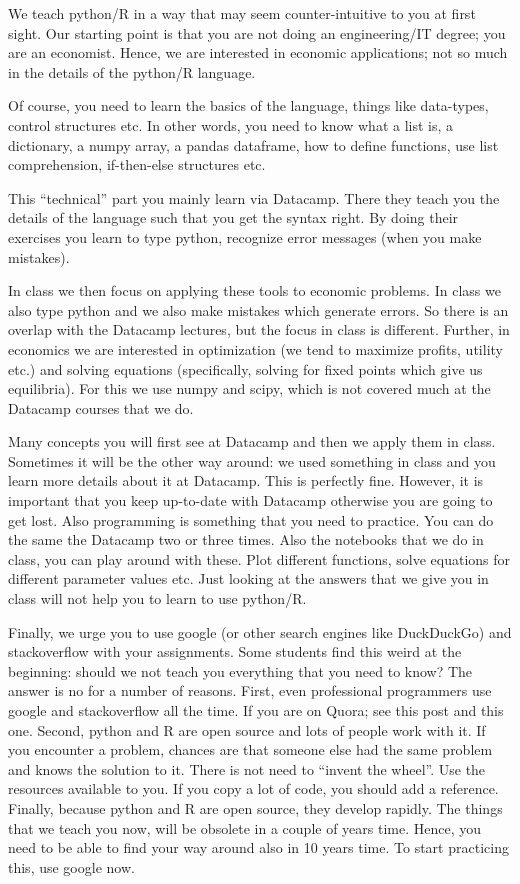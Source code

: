 \documentclass[]{book}
\begin{document}
We teach python/R in a way that may seem counter-intuitive to you at first sight. Our starting point is that you are not doing an engineering/IT degree; you are an economist. Hence, we are interested in economic applications; not so much in the details of the python/R language.

Of course, you need to learn the basics of the language, things like data-types, control structures etc. In other words, you need to know what a list is, a dictionary, a numpy array, a pandas dataframe, how to define functions, use list comprehension, if-then-else structures etc.

This ``technical'' part you mainly learn via Datacamp. There they teach you the details of the language such that you get the syntax right. By doing their exercises you learn to type python, recognize error messages (when you make mistakes).

In class we then focus on applying these tools to economic problems. In class we also type python and we also make mistakes which generate errors. So there is an overlap with the Datacamp lectures, but the focus in class is different. Further, in economics we are interested in optimization (we tend to maximize profits, utility etc.) and solving equations (specifically, solving for fixed points which give us equilibria). For this we use numpy and scipy, which is not covered much at the Datacamp courses that we do.

Many concepts you will first see at Datacamp and then we apply them in class. Sometimes it will be the other way around: we used something in class and you learn more details about it at Datacamp. This is perfectly fine. However, it is important that you keep up-to-date with Datacamp otherwise you are going to get lost. Also programming is something that you need to practice. You can do the same the Datacamp two or three times. Also the notebooks that we do in class, you can play around with these. Plot different functions, solve equations for different parameter values etc. Just looking at the answers that we give you in class will not help you to learn to use python/R.

Finally, we urge you to use google (or other search engines like DuckDuckGo) and stackoverflow with your assignments. Some students find this weird at the beginning: should we not teach you everything that you need to know? The answer is no for a number of reasons. First, even professional programmers use google and stackoverflow all the time. If you are on Quora; see this post and this one. Second, python and R are open source and lots of people work with it. If you encounter a problem, chances are that someone else had the same problem and knows the solution to it. There is not need to ``invent the wheel''. Use the resources available to you. If you copy a lot of code, you should add a reference. Finally, because python and R are open source, they develop rapidly. The things that we teach you now, will be obsolete in a couple of years time. Hence, you need to be able to find your way around also in 10 years time. To start practicing this, use google now.
\end{document}

